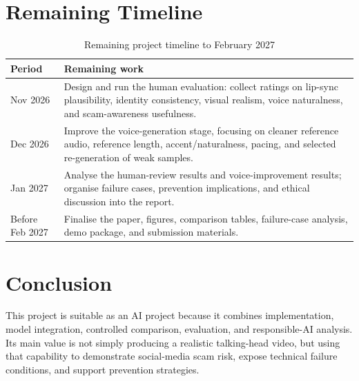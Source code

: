 \documentclass[10pt,conference]{IEEEtran}
\begin{document}
\section{Remaining Timeline}
\begin{table}[H]
\caption{Remaining project timeline to February 2027}
\label{tab:timeline}
\centering
\scriptsize
\begin{tabular}{@{}p{}p{}@{}}
\toprule
\textbf{Period} & \textbf{Remaining work} \\
\midrule
Nov 2026 & Design and run the human evaluation: collect ratings on lip-sync plausibility, identity consistency, visual realism, voice naturalness, and scam-awareness usefulness. \\
Dec 2026 & Improve the voice-generation stage, focusing on cleaner reference audio, reference length, accent/naturalness, pacing, and selected re-generation of weak samples. \\
Jan 2027 & Analyse the human-review results and voice-improvement results; organise failure cases, prevention implications, and ethical discussion into the report. \\
Before Feb 2027 & Finalise the paper, figures, comparison tables, failure-case analysis, demo package, and submission materials. \\
\bottomrule
\end{tabular}
\end{table}

\section{Conclusion}
This project is suitable as an AI project because it combines implementation, model integration, controlled comparison, evaluation, and responsible-AI analysis. Its main value is not simply producing a realistic talking-head video, but using that capability to demonstrate social-media scam risk, expose technical failure conditions, and support prevention strategies.
\end{document}
